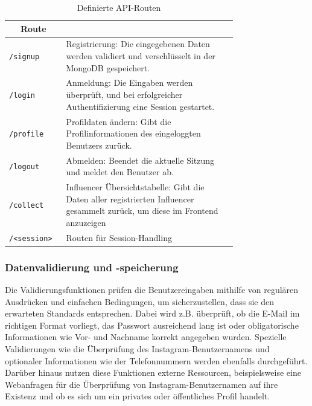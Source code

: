 \documentclass[conference,a4paper,flushend]{cs-techrep}
\begin{document}
\begin{table}[h]
    \centering
    \begin{tabular}{|l|>{\raggedright\arraybackslash}m{0.75\linewidth}|}
        \hline
  	 \multicolumn{1}{|c|}{\textbf{Route}} & \multicolumn{1}{c|}{\textbf{Zweck der Route}} \\
        \hline
        \verb|/signup| & Registrierung: Die eingegebenen Daten werden validiert und verschlüsselt in der MongoDB gespeichert. \\
        \hline
        \verb|/login| & Anmeldung: Die Eingaben werden überprüft, und bei erfolgreicher Authentifizierung eine Session gestartet. \\
        \hline
        \verb|/profile| & Profildaten ändern: Gibt die Profilinformationen des eingeloggten Benutzers zurück. \\
        \hline
        \verb|/logout| & Abmelden: Beendet die aktuelle Sitzung und meldet den Benutzer ab. \\
        \hline
        \verb|/collect| & Influencer Übersichtstabelle: Gibt die Daten aller registrierten Influencer gesammelt zurück, um diese im Frontend anzuzeigen \\
        \hline
	   \verb|/<session>| & Routen für Session-Handling \\
        \hline
    \end{tabular}
    \caption{Definierte API-Routen}
    \label{tab:api-routes}
\end{table}



\subsubsection{Datenvalidierung und -speicherung}
Die Validierungsfunktionen prüfen die Benutzereingaben mithilfe von regulären Ausdrücken und einfachen Bedingungen, um sicherzustellen, dass sie den erwarteten Standards entsprechen. Dabei wird z.B. überprüft, ob die E-Mail im richtigen Format vorliegt, das Passwort ausreichend lang ist oder obligatorische Informationen wie Vor- und Nachname korrekt angegeben wurden. Spezielle Validierungen wie die Überprüfung des Instagram-Benutzernamens und optionaler Informationen wie der Telefonnummern werden ebenfalls durchgeführt. Darüber hinaus nutzen diese Funktionen externe Ressourcen, beispielsweise eine Webanfragen für die Überprüfung von Instagram-Benutzernamen auf ihre Existenz und ob es sich um ein privates oder öffentliches Profil handelt. 
\end{document}
